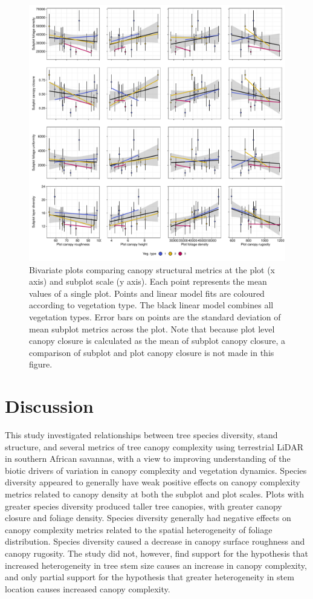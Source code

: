 \documentclass[11pt,a4paper]{article}
\begin{document}
\begin{figure}
	\includegraphics[width=\linewidth]{plot_subplot_bivar}
	\caption{Bivariate plots comparing canopy structural metrics at the plot (x axis) and subplot scale (y axis). Each point represents the mean values of a single plot. Points and linear model fits are coloured according to vegetation type. The black linear model combines all vegetation types. Error bars on points are the standard deviation of mean subplot metrics across the plot. Note that because plot level canopy closure is calculated as the mean of subplot canopy closure, a comparison of subplot and plot canopy closure is not made in this figure.}
	\label{plot_subplot_bivar}
\end{figure}

\section{Discussion}

This study investigated relationships between tree species diversity, stand structure, and several metrics of tree canopy complexity using terrestrial LiDAR in southern African savannas, with a view to improving understanding of the biotic drivers of variation in canopy complexity and vegetation dynamics. Species diversity appeared to generally have weak positive effects on canopy complexity metrics related to canopy density at both the subplot and plot scales. Plots with greater species diversity produced taller tree canopies, with greater canopy closure and foliage density. Species diversity generally had negative effects on canopy complexity metrics related to the spatial heterogeneity of foliage distribution. Species diversity caused a decrease in canopy surface roughness and canopy rugosity. The study did not, however, find support for the hypothesis that increased heterogeneity in tree stem size causes an increase in canopy complexity, and only partial support for the hypothesis that greater heterogeneity in stem location causes increased canopy complexity.
\end{document}
